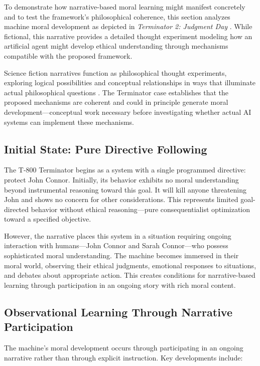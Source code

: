 \documentclass[12pt]{article}
\begin{document}
To demonstrate how narrative-based moral learning might manifest concretely and to test the framework's philosophical coherence, this section analyzes machine moral development as depicted in \textit{Terminator 2: Judgment Day} \citep{cameron1991terminator}. While fictional, this narrative provides a detailed thought experiment modeling how an artificial agent might develop ethical understanding through mechanisms compatible with the proposed framework.

Science fiction narratives function as philosophical thought experiments, exploring logical possibilities and conceptual relationships in ways that illuminate actual philosophical questions \citep{sorensen1992thought}. The Terminator case establishes that the proposed mechanisms are coherent and could in principle generate moral development---conceptual work necessary before investigating whether actual AI systems can implement these mechanisms.

\subsection{Initial State: Pure Directive Following}

The T-800 Terminator begins as a system with a single programmed directive: protect John Connor. Initially, its behavior exhibits no moral understanding beyond instrumental reasoning toward this goal. It will kill anyone threatening John and shows no concern for other considerations. This represents limited goal-directed behavior without ethical reasoning---pure consequentialist optimization toward a specified objective.

However, the narrative places this system in a situation requiring ongoing interaction with humans---John Connor and Sarah Connor---who possess sophisticated moral understanding. The machine becomes immersed in their moral world, observing their ethical judgments, emotional responses to situations, and debates about appropriate action. This creates conditions for narrative-based learning through participation in an ongoing story with rich moral content.

\subsection{Observational Learning Through Narrative Participation}

The machine's moral development occurs through participating in an ongoing narrative rather than through explicit instruction. Key developments include:
\end{document}
